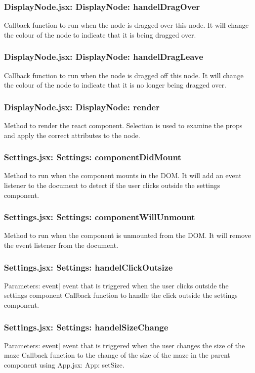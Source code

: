 \documentclass[titlepage]{article}
\begin{document}
\subsubsection{DisplayNode.jsx: DisplayNode: handelDragOver}
Callback function to run when the node is dragged over this node. It will change the colour of the node to indicate that it is being dragged over.

\subsubsection{DisplayNode.jsx: DisplayNode: handelDragLeave}
Callback function to run when the node is dragged off this node. It will change the colour of the node to indicate that it is no longer being dragged over.

\subsubsection{DisplayNode.jsx: DisplayNode: render}
Method to render the react component. Selection is used to examine the props and apply the correct attributes to the node.

\subsubsection{Settings.jsx: Settings: componentDidMount}
Method to run when the component mounts in the DOM. It will add an event listener to the document to detect if the user clicks outside the settings component.

\subsubsection{Settings.jsx: Settings: componentWillUnmount}
Method to run when the component is unmounted from the DOM. It will remove the event listener from the document.

\subsubsection{Settings.jsx: Settings: handelClickOutsize}
Parameters:\newline
\indent event| event that is triggered when the user clicks outside the settings component\newline
Callback function to handle the click outside the settings component.

\subsubsection{Settings.jsx: Settings: handelSizeChange}
Parameters:\newline
\indent event| event that is triggered when the user changes the size of the maze\newline
Callback function to the change of the size of the maze in the parent component using App.jsx: App: setSize.
\end{document}
